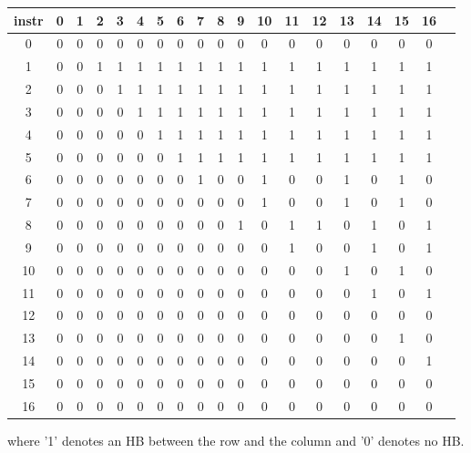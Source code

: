 \begin{table}[!htb]
\small
\begin{tabular}{c || c c c c c c c c c c c c c c c c c c}
\hline
instr & \textbf{0} & \textbf{1} & \textbf{2} & \textbf{3} & \textbf{4} & \textbf{5} & \textbf{6} & \textbf{7} & \textbf{8} & \textbf{9} & \textbf{10} & \textbf{11} & \textbf{12} & \textbf{13} & \textbf{14} & \textbf{15} & \textbf{16}\\
\hline\hline
0 & 0 & 0 & 0 & 0 & 0 & 0 & 0 & 0 & 0 & 0 & 0 & 0 & 0 & 0 & 0 & 0 & 0\\
\hline 
1 & 0 & 0 & 1 & 1 & 1 & 1 & 1 & 1 & 1 & 1 & 1 & 1 & 1 & 1 & 1 & 1 & 1\\
\hline 
2 & 0 & 0 & 0 & 1 & 1 & 1 & 1 & 1 & 1 & 1 & 1 & 1 & 1 & 1 & 1 & 1 & 1\\
\hline 
3 & 0 & 0 & 0 & 0 & 1 & 1 & 1 & 1 & 1 & 1 & 1 & 1 & 1 & 1 & 1 & 1 & 1\\
\hline 
4 & 0 & 0 & 0 & 0 & 0 & 1 & 1 & 1 & 1 & 1 & 1 & 1 & 1 & 1 & 1 & 1 & 1\\
\hline 
5 & 0 & 0 & 0 & 0 & 0 & 0 & 1 & 1 & 1 & 1 & 1 & 1 & 1 & 1 & 1 & 1 & 1\\
\hline 
6 & 0 & 0 & 0 & 0 & 0 & 0 & 0 & 1 & 0 & 0 & 1 & 0 & 0 & 1 & 0 & 1 & 0\\
\hline 
7 & 0 & 0 & 0 & 0 & 0 & 0 & 0 & 0 & 0 & 0 & 1 & 0 & 0 & 1 & 0 & 1 & 0\\
\hline 
8 & 0 & 0 & 0 & 0 & 0 & 0 & 0 & 0 & 0 & 1 & 0 & 1 & 1 & 0 & 1 & 0 & 1\\
\hline 
9 & 0 & 0 & 0 & 0 & 0 & 0 & 0 & 0 & 0 & 0 & 0 & 1 & 0 & 0 & 1 & 0 & 1\\
\hline 
10 & 0 & 0 & 0 & 0 & 0 & 0 & 0 & 0 & 0 & 0 & 0 & 0 & 0 & 1 & 0 & 1 & 0\\
\hline 
11 & 0 & 0 & 0 & 0 & 0 & 0 & 0 & 0 & 0 & 0 & 0 & 0 & 0 & 0 & 1 & 0 & 1\\
\hline 
12 & 0 & 0 & 0 & 0 & 0 & 0 & 0 & 0 & 0 & 0 & 0 & 0 & 0 & 0 & 0 & 0 & 0\\
\hline 
13 & 0 & 0 & 0 & 0 & 0 & 0 & 0 & 0 & 0 & 0 & 0 & 0 & 0 & 0 & 0 & 1 & 0\\
\hline 
14 & 0 & 0 & 0 & 0 & 0 & 0 & 0 & 0 & 0 & 0 & 0 & 0 & 0 & 0 & 0 & 0 & 1\\
\hline 
15 & 0 & 0 & 0 & 0 & 0 & 0 & 0 & 0 & 0 & 0 & 0 & 0 & 0 & 0 & 0 & 0 & 0\\
\hline 
16 & 0 & 0 & 0 & 0 & 0 & 0 & 0 & 0 & 0 & 0 & 0 & 0 & 0 & 0 & 0 & 0 & 0\\
\hline 
\end{tabular}
\end{table}

where '1' denotes an HB between the row and the column and '0' denotes no HB.\\
\normalsize